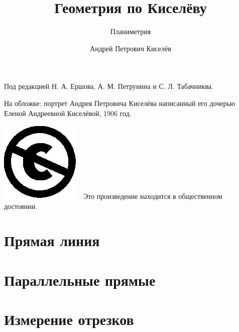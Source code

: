 \documentclass[twoside]{book}
\begin{document}
\cleardoublepage
\frontmatter
\title{Геометрия по Киселёву}
\subtitle{Планиметрия}
\author{Андрей Петрович Киселёв
}
\date{}
\maketitle

\thispagestyle{empty}

Под редакцией Н. А. Ершова, А. М. Петрунина и С. Л. Табачниква.

На обложке: портрет  Андрея Петровича Киселёва написанный его дочерью Еленой Андреевной Киселёвой, 1906 год.

\vfill
\noindent
\includegraphics[scale=.25]{eps/Cc-public_domain_mark_white}\ \ 
Это произведение находится в общественном достоянии.

\mainmatter





\chapter{Прямая линия}





\chapter{Параллельные прямые}










\chapter{Измерение отрезков}


\end{document}
